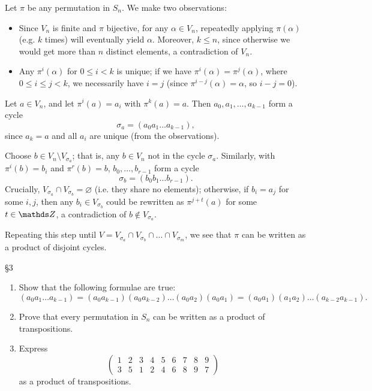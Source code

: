 \documentclass{homework}
\begin{document}
\begin{solution}
  Let $\pi$ be any permutation in $S_n$. We make two observations:
  \begin{itemize}
    \item Since $V_n$ is finite and $\pi$ bijective, for any $\alpha\in V_n$, repeatedly applying
      $\pi(\alpha)$ (e.g. $k$ times) will eventually yield $\alpha$. Moreover, $k\le n$, since
      otherwise we would get more than $n$ distinct elements, a contradiction of $V_n$.
    \item Any $\pi^{i}(\alpha)$ for $0\le i<k$ is unique; if we have
      $\pi^{i}(\alpha)=\pi^{j}(\alpha)$, where $0\le i\le j<k$, we necessarily have $i=j$ (since
      $\pi^{i-j}(\alpha)=\alpha$, so $i-j=0$).
  \end{itemize}

  Let $a\in V_n$, and let $\pi^{i}(a)=a_i$ with $\pi^{k}(a)=a$. Then $  a_0,a_1,\ldots,a_{k-1}$ form
  a cycle  \[
    \sigma_a=(a_0a_1\ldots a_{k-1})
  ,\] since $a_k=a$ and all $a_i$ are unique (from the observations).

  Choose $b\in V_n\setminus V_{\sigma_a}$; that is, any $b\in V_n$ not in the cycle $\sigma_a$.
  Similarly, with $\pi^{i}(b)=b_i$ and $\pi^{r}(b)=b$, $  b_0,\ldots,b_{r-1}$ form a cycle \[
    \sigma_b = (b_0b_1\ldots b_{r-1})
  .\] Crucially, $V_{\sigma_a}\cap V_{\sigma_b}=\varnothing$ (i.e. they share no elements);
  otherwise, if $b_i=a_j$ for some $i,j$, then any $b_i\in V_{\sigma_b}$ could be rewritten as
  $\pi^{j+t}(a)$ for some $t\in \Z$, a contradiction of $b\not\in V_{\sigma_a}$.

  Repeating this step until $V=V_{\sigma_a}\cap V_{\sigma_b}\cap \ldots\cap V_{\sigma_m}$, we see
  that $\pi$ can be written as a product of disjoint cycles.
\end{solution}

\begin{problem}{\S 3}
  \begin{enumerate}[label=(\alph*)]
    \item Show that the following formulae are true: \[
        (a_0a_1\ldots
          a_{k-1})=(a_0a_{k-1})(a_0a_{k-2})\ldots(a_0a_2)(a_0a_1)=(a_0a_1)(a_1a_2)\ldots(a_{k-2}a_{k-1})
      .\] 
    \item Prove that every permutation in $S_n$ can be written as a product of transpositions.
    \item Express \[
        \begin{pmatrix} 1&2&3&4&5&6&7&8&9\\3&5&1&2&4&6&8&9&7 \end{pmatrix}
    \] as a product of transpositions.
  \end{enumerate}
\end{problem}
\end{document}
